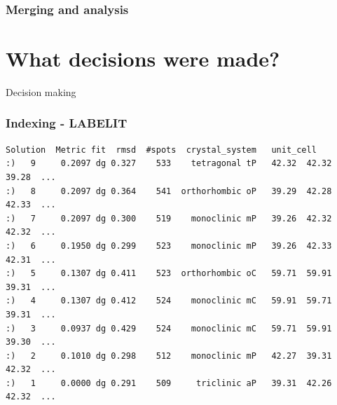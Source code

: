 \documentclass[slides,compress]{beamer}
\begin{document}
\begin{frame}
\frametitle{Merging and analysis}
\begin{itemize}
\end{itemize}
\end{frame}

\section{What decisions were made?}

\begin{frame}
\begin{center}
\Huge Decision making
\end{center}
\end{frame}

\begin{frame}[fragile]
\frametitle{Indexing - LABELIT}
{\small
\begin{verbatim}
Solution  Metric fit  rmsd  #spots  crystal_system   unit_cell 
:)   9     0.2097 dg 0.327    533    tetragonal tP   42.32  42.32  39.28  ...
:)   8     0.2097 dg 0.364    541  orthorhombic oP   39.29  42.28  42.33  ...
:)   7     0.2097 dg 0.300    519    monoclinic mP   39.26  42.32  42.32  ...
:)   6     0.1950 dg 0.299    523    monoclinic mP   39.26  42.33  42.31  ...
:)   5     0.1307 dg 0.411    523  orthorhombic oC   59.71  59.91  39.31  ...
:)   4     0.1307 dg 0.412    524    monoclinic mC   59.91  59.71  39.31  ...
:)   3     0.0937 dg 0.429    524    monoclinic mC   59.71  59.91  39.30  ...
:)   2     0.1010 dg 0.298    512    monoclinic mP   42.27  39.31  42.32  ...
:)   1     0.0000 dg 0.291    509     triclinic aP   39.31  42.26  42.32  ...
\end{verbatim}
}
\end{frame}
\end{document}
